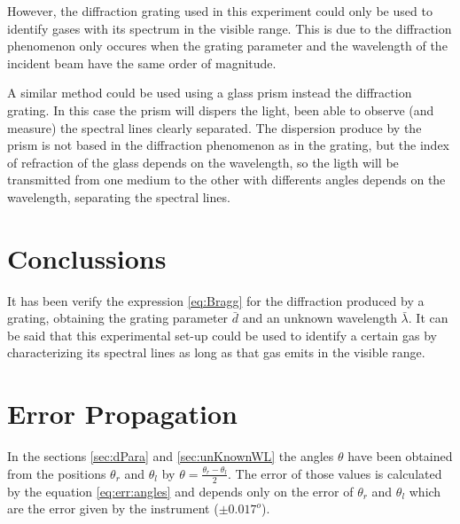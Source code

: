 \documentclass[twoside]{article}
\begin{document}
\begin{multicols}{2}
			However, the diffraction grating used in this experiment could only be used to identify gases with its spectrum in the visible range. This is due to the diffraction phenomenon only occures when the grating parameter and the wavelength of the incident beam have the same order of magnitude.

			A similar method could be used using a glass prism instead the diffraction grating. In this case the prism will dispers the light, been able to observe (and measure) the spectral lines clearly separated. The dispersion produce by the prism is not based in the diffraction phenomenon as in the grating, but the index of refraction of the glass depends on the wavelength, so the ligth will be transmitted from one medium to the other with differents angles depends on the wavelength, separating the spectral lines. 

		\section{Conclussions}

			It has been verify the expression \ref{eq:Bragg} for the diffraction produced by a grating, obtaining the grating parameter $\bar{d}$ and an unknown wavelength $\bar{\lambda}$. It can be said that this experimental set-up could be used to identify a certain gas by characterizing its spectral lines as long as that gas emits in the visible range.

	\end{multicols}

	
	



	\appendix

		\section{Error Propagation}
			\label{appendix}

			In the sections \ref{sec:dPara} and \ref{sec:unKnownWL} the angles $\theta$ have been obtained from the positions $\theta_r$ and $\theta_l$ by $\theta = \frac{\theta_r - \theta_l} {2}$. The error of those values is calculated by the equation \ref{eq:err:angles} and depends only on the error of $\theta_r$ and $\theta_l$ which are the error given by the instrument ($\pm 0.017 ^o$).
\end{document}
